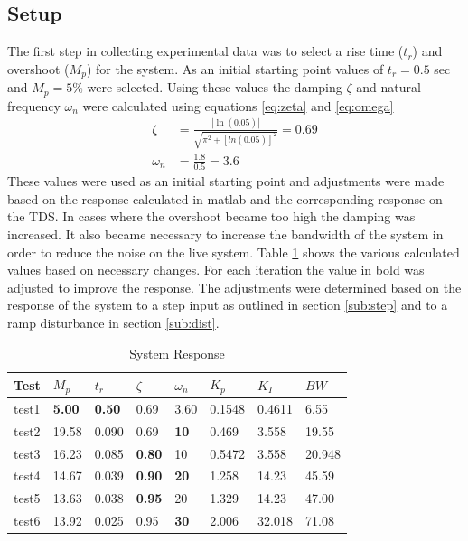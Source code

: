 \documentclass[11pt,titlepage]{article}
\begin{document}
    \subsection{Setup}
    The first step in collecting experimental data was to select a rise time ($t_r$) and overshoot ($M_p$) for the system. As an initial starting point values of $t_r = 0.5$ sec and $M_p = 5\%$ were selected. Using these values the damping $\zeta$ and natural frequency $\omega_n$ were calculated using equations \ref{eq:zeta} and \ref{eq:omega}
    \begin{align}
        \zeta &= \frac{|\ln(0.05)|}{\sqrt{\pi^2+[ln(0.05)]^2}} = 0.69 \label{eq:zeta} \\[1em]
        \omega_n &= \frac{1.8}{0.5} = 3.6 \label{eq:omega}
    \end{align}
    These values were used as an initial starting point and adjustments were made based on the response calculated in matlab and the corresponding response on the TDS. In cases where the overshoot became too high the damping was increased. It also became necessary to increase the bandwidth of the system in order to reduce the noise on the live system. Table \ref{table:respData} shows the various calculated values based on necessary changes. For each iteration the value in bold was adjusted to improve the response. The adjustments were determined based on the response of the system to a step input as outlined in section \ref{sub:step} and to a ramp disturbance in section \ref{sub:dist}.
    \begin{table}[H]
        \centering
        \begin{tabular}{|m{1.5cm}|m{1.5cm}|m{1.5cm}|m{1.5cm}|m{1.5cm}|m{1.5cm}|m{1.5cm}|m{1.5cm}|} 
            \hline
            Test & $M_p$ & $t_r$ & $\zeta$ & $\omega_n$ & $K_p$ & $K_I$ & $BW$ \\ 
            \hline
            test1 & \textbf{5.00} & \textbf{0.50} & 0.69 & 3.60 & 0.1548 & 0.4611 & 6.55 \\
            \hline
            test2 & 19.58 & 0.090 & 0.69 & \textbf{10} & 0.469 & 3.558 & 19.55 \\
            \hline
            test3 & 16.23 & 0.085 & \textbf{0.80} & 10 & 0.5472 & 3.558 & 20.948 \\
            \hline
            test4 & 14.67 & 0.039 & \textbf{0.90} & \textbf{20} & 1.258 & 14.23 & 45.59 \\
            \hline
            test5 & 13.63 & 0.038 & \textbf{0.95} & 20 & 1.329 & 14.23 & 47.00 \\
            \hline
            test6 & 13.92 & 0.025 & 0.95 & \textbf{30} & 2.006 & 32.018 & 71.08 \\
            \hline
        \end{tabular}
        \caption{System Response} \label{table:respData}
    \end{table}
\end{document}
